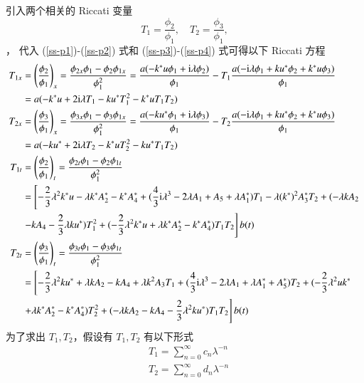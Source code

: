 引入两个相关的 Riccati 变量
\begin{equation}
  T_{1} = \frac{\phi_{2}}{\phi_{1}}, \quad T_{2} = \frac{\phi_{3}}{\phi_{1}},
\end{equation}，
代入 (\ref{ss-p1})-(\ref{ss-p2}) 式和 (\ref{ss-p3})-(\ref{ss-p4}) 式可得以下 Riccati 方程
\begin{align}
  T_{1x} &= \left(\frac{\phi_2}{\phi_1}\right)_x=\frac{\phi_{2x}\phi_1-\phi_2\phi_{1x}}{\phi_1^2}=\frac{a(-k^*u\phi_1+\mathrm{i}\lambda\phi_2)}{\phi_1}-T_1\frac{a(-\mathrm{i}\lambda\phi_1+ku^*\phi_2+k^*u\phi_3)}{\phi_1}\nonumber\\
  &= a(-k^{*}u + 2\mathrm{i}\lambda T_{1} - ku^{*}T_{1}^{2} - k^{*}uT_{1}T_{2}) \label{ss-t1x} \\
  T_{2x} &=\left(\frac{\phi_3}{\phi_1}\right)_x=\frac{\phi_{3x}\phi_1-\phi_3\phi_{1x}}{\phi_1^2}=\frac{a(-ku^*\phi_1+\mathrm{i}\lambda\phi_3)}{\phi_1}-T_2\frac{a(-\mathrm{i}\lambda\phi_1+ku^*\phi_2+k^*u\phi_3)}{\phi_1}\nonumber\\
  &= a(-ku^{*} + 2\mathrm{i}\lambda T_{2} - k^{*}uT_{2}^{2} - ku^{*}T_{1}T_{2}) \label{ss-t2x} \\
  T_{1t} &=\left(\frac{\phi_2}{\phi_1}\right)_t=\frac{\phi_{2t}\phi_1-\phi_2\phi_{1t}}{\phi_1^2}\nonumber\\
  &= \left[-\frac{2}{3}\lambda^{2}k^{*}u - \lambda k^{*}A_{2}^{*} - k^{*}A_{4}^{*} + (\frac{4}{3}\mathrm{i}\lambda^{3}-2\lambda A_{1}+A_{5}+\lambda A_{1}^{*})T_{1} - \lambda (k^{*})^{2}A_{3}^{*}T_{2} + (-\lambda kA_{2} \right.\notag\\
  & \left. - kA_{4} - \frac{2}{3}\lambda ku^{*})T_{1}^{2} + (-\frac{2}{3}\lambda^{2}k^{*}u+\lambda k^{*}A_{2}^{*}-k^{*}A_{4}^{*})T_{1}T_{2} \right]b(t) \\
  T_{2t} &=\left(\frac{\phi_3}{\phi_1}\right)_t=\frac{\phi_{3t}\phi_1-\phi_3\phi_{1t}}{\phi_1^2}\nonumber\\
  &= \left[-\frac{2}{3}\lambda^{2}ku^{*} + \lambda kA_{2} - kA_{4} + \lambda k^{2}A_{3}T_{1} + (\frac{4}{3}\mathrm{i}\lambda^{3}-2\lambda A_{1}+\lambda A_{1}^{*}+A_{5}^{*})T_{2} + (-\frac{2}{3}\lambda^{2}uk^{*} \right. \notag\\
  & \left. +\lambda k^{*}A_{2}^{*}-k^{*}A_{4}^{*})T_{2}^{2} + (-\lambda kA_{2}-kA_{4}-\frac{2}{3}\lambda^{2}ku^{*})T_{1}T_{2} \right]b(t)
\end{align}
为了求出 $T_1, T_2$，假设有 $T_{1}, T_{2}$ 有以下形式
\begin{align}
  & T_{1} = \sum_{n=0}^{\infty}c_{n}\lambda^{-n} \label{ss-t1}\\
  & T_{2} = \sum_{n=0}^{\infty}d_{n}\lambda^{-n} \label{ss-t2}
\end{align}
